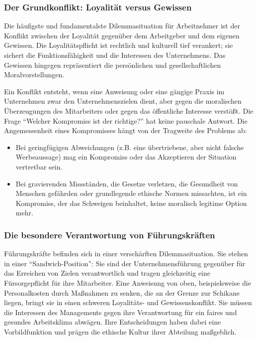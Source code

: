 \documentclass[
    12pt,               %
    a4paper,            %
    ngerman             %
]{scrartcl}
\begin{document}
\subsubsection*{Der Grundkonflikt: Loyalität versus Gewissen}
Die häufigste und fundamentalste Dilemmasituation für Arbeitnehmer ist der Konflikt zwischen der Loyalität gegenüber dem Arbeitgeber und dem eigenen Gewissen. Die Loyalitätspflicht ist rechtlich und kulturell tief verankert; sie sichert die Funktionsfähigkeit und die Interessen des Unternehmens. Das Gewissen hingegen repräsentiert die persönlichen und gesellschaftlichen Moralvorstellungen.

Ein Konflikt entsteht, wenn eine Anweisung oder eine gängige Praxis im Unternehmen zwar den Unternehmenszielen dient, aber gegen die moralischen Überzeugungen des Mitarbeiters oder gegen das öffentliche Interesse verstößt. Die Frage \enquote{Welcher Kompromiss ist der richtige?} hat keine pauschale Antwort. Die Angemessenheit eines Kompromisses hängt von der Tragweite des Problems ab:
\begin{itemize}
    \item Bei geringfügigen Abweichungen (z.B. eine übertriebene, aber nicht falsche Werbeaussage) mag ein Kompromiss oder das Akzeptieren der Situation vertretbar sein.
    \item Bei gravierenden Missständen, die Gesetze verletzen, die Gesundheit von Menschen gefährden oder grundlegende ethische Normen missachten, ist ein Kompromiss, der das Schweigen beinhaltet, keine moralisch legitime Option mehr.
\end{itemize}

\subsubsection*{Die besondere Verantwortung von Führungskräften}
Führungskräfte befinden sich in einer verschärften Dilemmasituation. Sie stehen in einer \enquote{Sandwich-Position}: Sie sind der Unternehmensführung gegenüber für das Erreichen von Zielen verantwortlich und tragen gleichzeitig eine Fürsorgepflicht für ihre Mitarbeiter. Eine Anweisung von oben, beispielsweise die Personalkosten durch Maßnahmen zu senken, die an der Grenze zur Schikane liegen, bringt sie in einen schweren Loyalitäts- und Gewissenskonflikt. Sie müssen die Interessen des Managements gegen ihre Verantwortung für ein faires und gesundes Arbeitsklima abwägen. Ihre Entscheidungen haben dabei eine Vorbildfunktion und prägen die ethische Kultur ihrer Abteilung maßgeblich.
\end{document}

